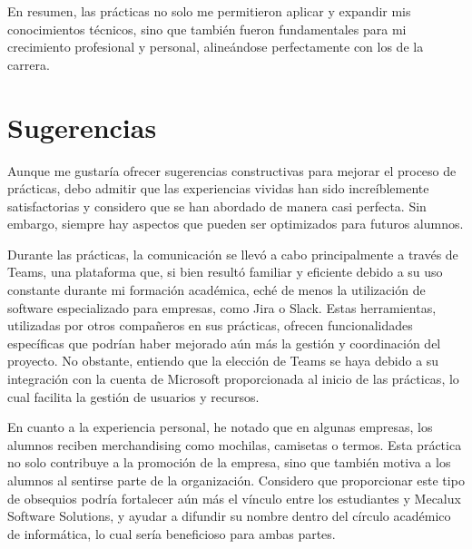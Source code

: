 En resumen, las prácticas no solo me permitieron aplicar y expandir mis conocimientos técnicos, sino que también fueron fundamentales para mi crecimiento profesional y personal, alineándose perfectamente con los de la carrera.

\section{Sugerencias}
Aunque me gustaría ofrecer sugerencias constructivas para mejorar el proceso de prácticas, debo admitir que las experiencias vividas han sido increíblemente satisfactorias y considero que se han abordado de manera casi perfecta. Sin embargo, siempre hay aspectos que pueden ser optimizados para futuros alumnos.

Durante las prácticas, la comunicación se llevó a cabo principalmente a través de Teams, una plataforma que, si bien resultó familiar y eficiente debido a su uso constante durante mi formación académica, eché de menos la utilización de software especializado para empresas, como Jira o Slack. Estas herramientas, utilizadas por otros compañeros en sus prácticas, ofrecen funcionalidades específicas que podrían haber mejorado aún más la gestión y coordinación del proyecto. No obstante, entiendo que la elección de Teams se haya debido a su integración con la cuenta de Microsoft proporcionada al inicio de las prácticas, lo cual facilita la gestión de usuarios y recursos.

En cuanto a la experiencia personal, he notado que en algunas empresas, los alumnos reciben merchandising como mochilas, camisetas o termos. Esta práctica no solo contribuye a la promoción de la empresa, sino que también motiva a los alumnos al sentirse parte de la organización. Considero que proporcionar este tipo de obsequios podría fortalecer aún más el vínculo entre los estudiantes y Mecalux Software Solutions, y ayudar a difundir su nombre dentro del círculo académico de informática, lo cual sería beneficioso para ambas partes.